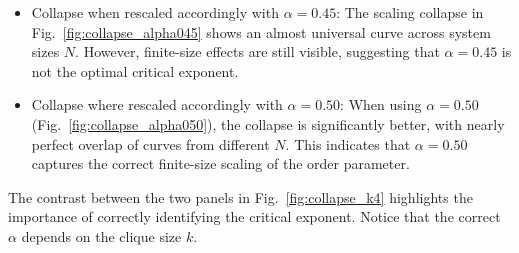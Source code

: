 \begin{itemize}
\item Collapse when rescaled accordingly with $\alpha=0.45$:  
The scaling collapse in Fig.~\ref{fig:collapse_alpha045} shows an almost universal curve across system sizes $N$.  
However, finite-size effects are still visible, suggesting that $\alpha=0.45$ is not the optimal critical exponent.

\item Collapse where rescaled accordingly with $\alpha=0.50$:  
When using $\alpha=0.50$ (Fig.~\ref{fig:collapse_alpha050}), the collapse is significantly better, with nearly perfect overlap of curves from different $N$.  
This indicates that $\alpha=0.50$ captures the correct finite-size scaling of the order parameter.
\end{itemize}
The contrast between the two panels in Fig.~\ref{fig:collapse_k4} highlights the importance of correctly identifying the critical exponent.  
Notice that the correct $\alpha$ depends on the clique size $k$.
